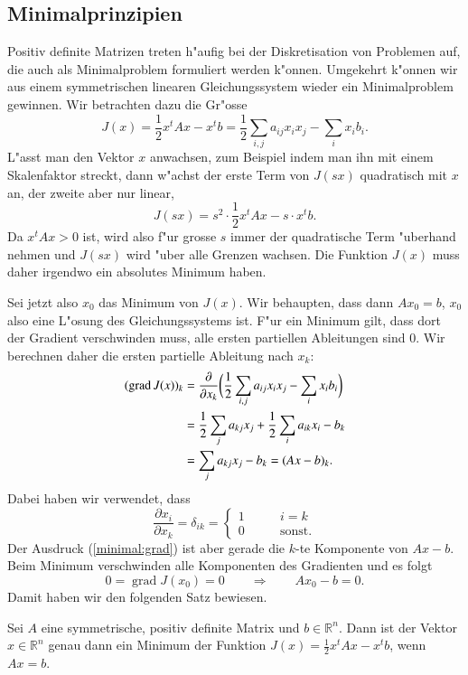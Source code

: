 \subsection{Minimalprinzipien}
Positiv definite Matrizen treten h"aufig bei der Diskretisation von 
Problemen auf, die auch als Minimalproblem formuliert werden k"onnen.
Umgekehrt k"onnen wir aus einem symmetrischen linearen Gleichungssystem
wieder ein Minimalproblem gewinnen.
Wir betrachten dazu die Gr"osse
\[
J(x)=\frac12x^tAx-x^tb =
\frac12\sum_{i,j}a_{ij}x_ix_j-\sum_ix_ib_i.
\]
L"asst man den Vektor $x$ anwachsen, zum Beispiel indem man ihn mit
einem Skalenfaktor streckt, dann w"achst der erste Term von $J(sx)$
quadratisch mit $x$ an, der zweite aber nur linear,
\[
J(sx)=s^2\cdot\frac12x^tAx - s\cdot x^tb.
\]
Da $x^tAx >0$ ist, wird also f"ur grosse $s$ immer der quadratische
Term "uberhand nehmen und $J(sx)$ wird "uber alle Grenzen wachsen.
Die Funktion $J(x)$ muss daher irgendwo ein absolutes Minimum
haben.

Sei jetzt also $x_0$ das Minimum von $J(x)$.
Wir behaupten, dass dann $Ax_0=b$, $x_0$ also eine L"osung des
Gleichungssystems ist.
F"ur ein Minimum gilt, dass dort der Gradient verschwinden muss,
alle ersten partiellen Ableitungen sind $0$.
Wir berechnen daher die ersten partielle Ableitung nach $x_k$:
\begin{align}
(\operatorname{grad}J(x))_k
&=
\frac{\partial}{\partial x_k}\biggl(
\frac12\sum_{i,j}a_{ij}x_ix_j-\sum_ix_ib_i\biggr)
\notag
\\
&=
\frac12\sum_j a_{kj}x_j+\frac12\sum_i a_{ik}x_i-b_k
\notag
\\
&=\sum_j a_{kj}x_j-b_k = (Ax-b)_k.
\label{minimal:grad}
\end{align}
Dabei haben wir verwendet, dass
\[
\frac{\partial x_i}{\partial x_k}=\delta_{ik}=\begin{cases}1&\qquad i=k\\
0&\qquad\text{sonst.}\end{cases}
\]
Der Ausdruck (\ref{minimal:grad}) ist aber gerade die $k$-te Komponente
von $Ax-b$.
Beim Minimum verschwinden alle Komponenten des Gradienten und es folgt
\[
0=\operatorname{grad}J(x_0) = 0\qquad\Rightarrow\qquad Ax_0-b=0.
\]
Damit haben wir den folgenden Satz bewiesen.

\begin{satz}
Sei $A$ eine symmetrische, positiv definite Matrix und $b\in\mathbb R^n$.
Dann ist der Vektor $x\in\mathbb R^n$ genau dann ein Minimum 
der Funktion $J(x)=\frac12x^tAx-x^tb$, wenn $Ax=b$.
\end{satz}

